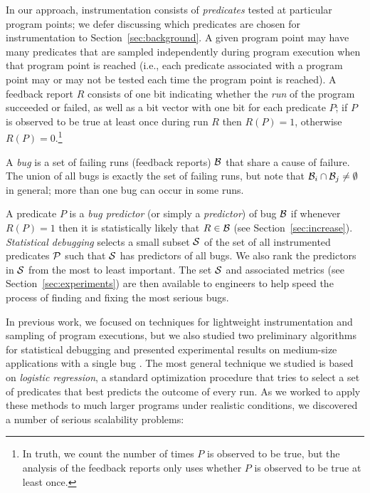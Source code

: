 \documentclass[draft]{sig-alternate}
\begin{document}
In our approach, instrumentation consists of {\em predicates} tested
at particular program points; we defer discussing which predicates are
chosen for instrumentation to Section~\ref{sec:background}.  A given
program point may have many predicates that are sampled independently
during program execution when that program point is reached (i.e.,
each predicate associated with a program point may or may not be
tested each time the program point is reached).  A feedback report $R$
consists of one bit indicating whether the {\em run} of the program
succeeded or failed, as well as a bit vector with one bit for each
predicate $P$; if $P$ is observed to be true at least once during run
$R$ then $R(P) = 1$, otherwise $R(P) = 0$.\footnote{In truth, we count
the number of times $P$ is observed to be true, but the analysis of
the feedback reports only uses whether $P$ is observed to be true at
least once.}

A {\em bug} is a set of failing runs (feedback reports) ${\cal B}$
that share a cause of failure.  The union of all bugs is exactly the
set of failing runs, but note that ${\cal B}_i \cap {\cal B}_j \neq
\emptyset$ in general; more than one bug can occur in some runs.

A predicate $P$ is a {\em bug predictor} (or simply a {\em predictor})
of bug ${\cal B}$ if whenever $R(P) = 1$ then it is statistically
likely that $R \in {\cal B}$ (see Section~\ref{sec:increase}).  {\em
Statistical debugging} selects a small subset ${\cal S}$ of the set of
all instrumented predicates ${\cal P}$ such that ${\cal S}$ has
predictors of all bugs.  We also rank the predictors in ${\cal S}$
from the most to least important.  The set ${\cal S}$ and associated
metrics (see Section~\ref{sec:experiments}) are then available to
engineers to help speed the process of finding and fixing the most
serious bugs.

In previous work, we focused on techniques
for lightweight instrumentation and sampling of program executions, but
we also studied two preliminary algorithms for statistical debugging and
presented experimental results on medium-size applications with a
single bug \cite{PLDI`03*141,Zheng:2003:SDSP}.  The most general
technique we studied is based on {\em logistic regression}, a standard
optimization procedure that tries to select a set of predicates that
best predicts the outcome of every run. As we worked to apply these
methods to much larger programs under realistic conditions, we
discovered a number of serious scalability problems:
\end{document}
